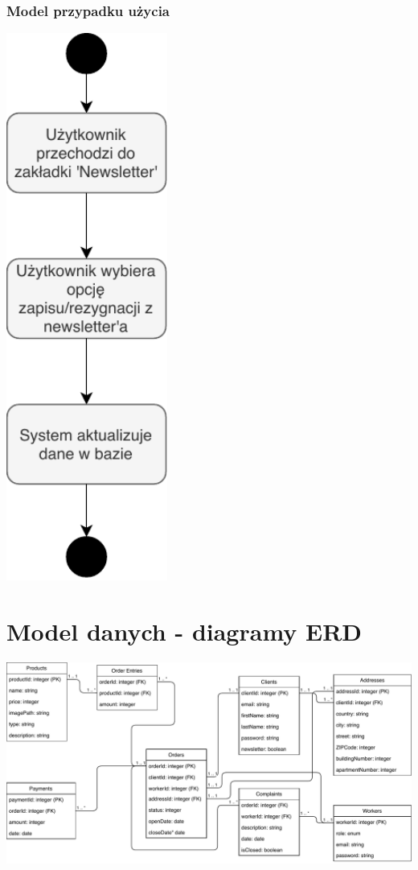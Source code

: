 \documentclass[12pt]{report}
\begin{document}
	\subsection{Model przypadku użycia}
	\begin{center}
		\includegraphics[width=150pt]{newsletter.pdf}
	\end{center}
	\newpage
	

	\renewcommand{\thesection}{\thechapter.\arabic{section}}		
	
	\chapter{Model danych - diagramy ERD}

	\includegraphics[width=500pt]{database.pdf}
	
\end{document}
